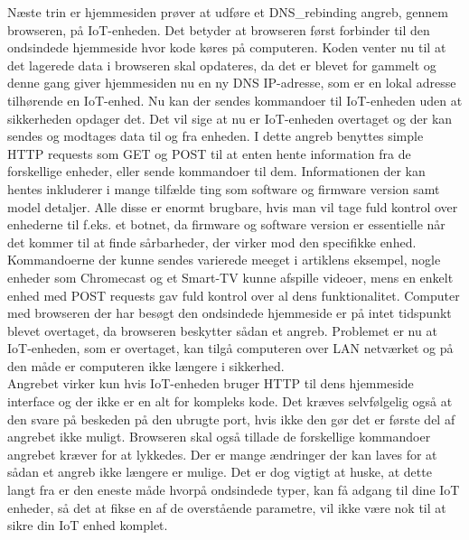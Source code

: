 Næste trin er hjemmesiden prøver at udføre et \Gls{DNS_rebinding} angreb, gennem browseren, på IoT-enheden. Det betyder at browseren først forbinder til den ondsindede hjemmeside hvor kode køres på computeren. Koden venter nu til at det lagerede data i browseren skal opdateres, da det er blevet for gammelt og denne gang giver hjemmesiden nu en ny DNS IP-adresse, som er en lokal adresse tilhørende en IoT-enhed. Nu kan der sendes kommandoer til IoT-enheden uden at sikkerheden opdager det. Det vil sige at nu er IoT-enheden overtaget og der kan sendes og modtages data til og fra enheden. I dette angreb benyttes simple HTTP requests som \Gls{GET} og \Gls{POST} til at enten hente information fra de forskellige enheder, eller sende kommandoer til dem. Informationen der kan hentes inkluderer i mange tilfælde ting som software og firmware version samt model detaljer. Alle disse er enormt brugbare, hvis man vil tage fuld kontrol over enhederne til f.eks. et \gls{botnet}, da firmware og software version er essentielle når det kommer til at finde sårbarheder, der virker mod den specifikke enhed. Kommandoerne der kunne sendes varierede meeget i artiklens eksempel, nogle enheder som Chromecast og et Smart-TV kunne afspille videoer, mens en enkelt enhed med \Gls{POST} requests gav fuld kontrol over al dens funktionalitet.
Computer med browseren der har besøgt den ondsindede hjemmeside er på intet tidspunkt blevet overtaget, da browseren beskytter sådan et angreb. Problemet er nu at IoT-enheden, som er overtaget, kan tilgå computeren over LAN netværket og på den måde er computeren ikke længere i sikkerhed.
\\
Angrebet virker kun hvis IoT-enheden bruger HTTP til dens hjemmeside interface og der ikke er en alt for kompleks kode. Det kræves selvfølgelig også at den svare på beskeden på den ubrugte port, hvis ikke den gør det er første del af angrebet ikke muligt. Browseren skal også tillade de forskellige kommandoer angrebet kræver for at lykkedes. Der er mange ændringer der kan laves for at sådan et angreb ikke længere er mulige. Det er dog vigtigt at huske, at dette langt fra er den eneste måde hvorpå ondsindede typer, kan få adgang til dine IoT enheder, så det at fikse en af de overstående parametre, vil ikke være nok til at sikre din IoT enhed komplet.
\\